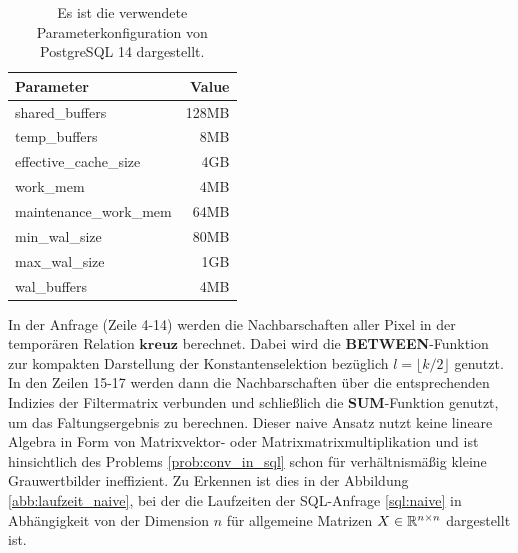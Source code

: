 \begin{table}[h]
    \centering
    \begin{tabular}{|l|r|} \hline
        Parameter & Value \\
        \hline
        shared\_buffers &128MB \\
        \hline
        temp\_buffers &8MB \\
        \hline
        effective\_cache\_size &4GB \\
        \hline
        work\_mem &4MB \\
        \hline
        maintenance\_work\_mem &64MB \\
        \hline
        min\_wal\_size &80MB \\
        \hline
        max\_wal\_size &1GB \\
        \hline
        wal\_buffers &4MB \\
        \hline
    \end{tabular}
    \caption[PostgreSQL-Parameterkonfiguration]{Es ist die verwendete Parameterkonfiguration von PostgreSQL 14 dargestellt.}
    \label{tab:systemspecs}
\end{table}



In der Anfrage (Zeile 4-14) werden die Nachbarschaften aller Pixel in der temporären Relation $\mathbf{kreuz}$ berechnet. Dabei wird die \textbf{BETWEEN}-Funktion zur kompakten Darstellung der Konstantenselektion bezüglich $l=\lfloor k/2 \rfloor$ genutzt. In den Zeilen 15-17 werden dann die Nachbarschaften über die entsprechenden Indizies der Filtermatrix verbunden und schließlich die \textbf{SUM}-Funktion genutzt, um das Faltungsergebnis zu berechnen. Dieser naive Ansatz nutzt keine lineare Algebra in Form von Matrixvektor- oder Matrixmatrixmultiplikation und ist hinsichtlich des Problems \ref{prob:conv_in_sql} schon für verhältnismäßig kleine Grauwertbilder ineffizient. Zu Erkennen ist dies in der Abbildung \ref{abb:laufzeit_naive}, bei der die Laufzeiten der SQL-Anfrage \ref{sql:naive} in Abhängigkeit von der Dimension $n$ für allgemeine Matrizen $X \in \mathbb{R}^{n \times n}$ dargestellt ist.

